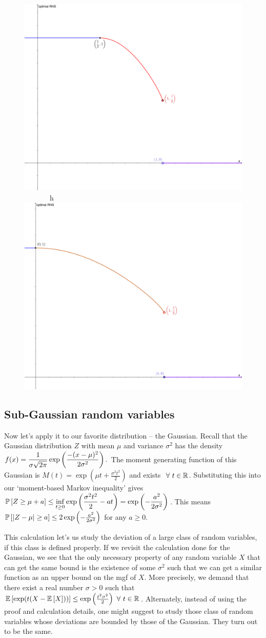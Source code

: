 \begin{figure}[h]
\centering
\includegraphics[width=0.45\linewidth]{bernouli}~~~~~~~h~~~
\includegraphics[width=0.45\linewidth]{rademacher}
\end{figure}

\subsection{Sub-Gaussian random variables}

Now let's apply it to our favorite distribution -- the Gaussian. Recall that the Gaussian distribution $Z$ with mean $\mu$ and variance $\sigma^{2}$ has the density $\displaystyle f(x) = \frac{1}{\sigma\sqrt{2\pi}} \exp\left(\frac{-(x-\mu)^{2}}{2\sigma^{2}}\right).$ The moment generating function of this Gaussian is $M(t) = \exp\left(\mu t + \frac{\sigma^{2}t^{2}}{2}\right)$ and exists $~\forall~ t\in\mathbb{R}$. Substituting this into our `moment-based Markov inequality' gives $\displaystyle\mathbb P\left[ Z\ge \mu+a \right] \le \inf_{t\ge 0} \exp\left(\frac{\sigma^{2}t^{2}}{2}-at\right) = \exp\left(-\frac{a^{2}}{2\sigma^{2}}\right)$. This means $\mathbb P\left[ \left| Z-\mu \right| \ge a \right] \le 2 \exp\left(-\frac{a^{2}}{2\sigma^{2}}\right)$ for any $a\ge 0$. 

This calculation let's us study the deviation of a large class of random variables, if this class is defined properly. If we revisit the calculation done for the Gaussian, we see that the only necessary property of any random variable $X$ that can get the same bound is the existence of some $\sigma^{2}$ such that we can get a similar function as an upper bound on the mgf of $X$. More precisely, we demand that there exist a real number $\sigma > 0$ such that $\mathbb E\left[ \exp(t(X-\mathbb E\left[ X \right])) \right] \le \exp\left(\frac{t^{2}\sigma^{2}}{2}\right)~\forall~ t\in\mathbb{R}$. Alternately, instead of using the proof and calculation details, one might suggest to study those class of random variables whose deviations are bounded by those of the Gaussian. They turn out to be the same.

